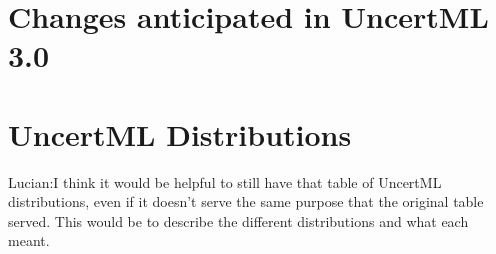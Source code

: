 \documentclass[draftspec]{sbmlpkgspec}
\newcommand{\controversial}{\marginpar{\hspace*{34pt}\raisebox{-0.5ex}{\Large?}}}
\begin{document}
\appendix
\section{Changes anticipated in UncertML 3.0}


\section{UncertML Distributions}
\label{sec:uncertml-distributions}

{\color{red}Lucian:\controversial I think it would be helpful to still have that table of UncertML distributions, even if it doesn't serve the same purpose that the original table served.  This would be to describe the different distributions and what each meant.}



\end{document}
